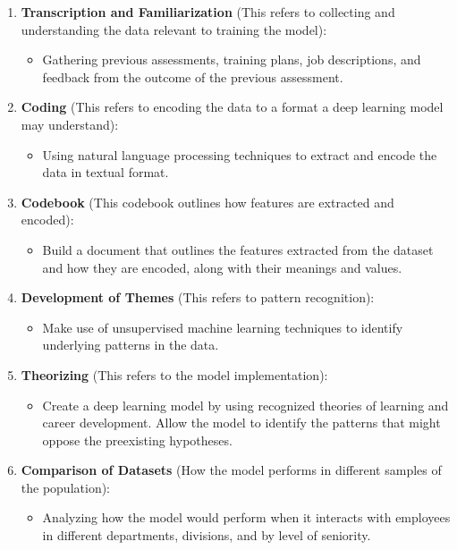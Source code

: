 \begin{enumerate}[label=\arabic*.]
    \item \textbf{Transcription and Familiarization} (This refers to collecting and understanding the data relevant to training the model):
    \begin{itemize}
        \item Gathering previous assessments, training plans, job descriptions, and feedback from the outcome of the previous assessment.
    \end{itemize}

    \item \textbf{Coding} (This refers to encoding the data to a format a deep learning model may understand):
    \begin{itemize}
        \item Using natural language processing techniques to extract and encode the data in textual format.
    \end{itemize}

    \item \textbf{Codebook} (This codebook outlines how features are extracted and encoded):
    \begin{itemize}
        \item Build a document that outlines the features extracted from the dataset and how they are encoded, along with their meanings and values.
    \end{itemize}

    \item \textbf{Development of Themes} (This refers to pattern recognition):
    \begin{itemize}
        \item Make use of unsupervised machine learning techniques to identify underlying patterns in the data.
    \end{itemize}

    \item \textbf{Theorizing} (This refers to the model implementation):
    \begin{itemize}
        \item Create a deep learning model by using recognized theories of learning and career development. Allow the model to identify the patterns that might oppose the preexisting hypotheses.
    \end{itemize}

    \item \textbf{Comparison of Datasets} (How the model performs in different samples of the population):
    \begin{itemize}
        \item Analyzing how the model would perform when it interacts with employees in different departments, divisions, and by level of seniority.
    \end{itemize}


\end{enumerate}

